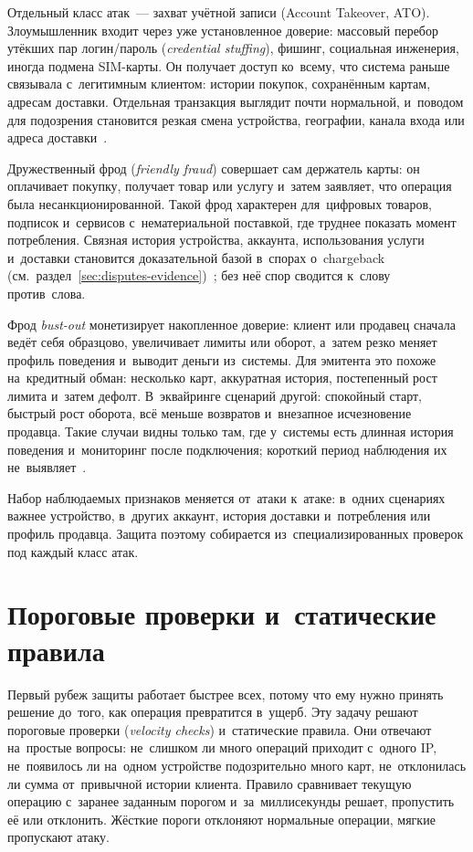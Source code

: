 Отдельный класс атак~--- захват учётной записи (Account Takeover, ATO).
Злоумышленник входит через уже установленное доверие: массовый перебор утёкших
пар логин/пароль (\textit{credential stuffing}), фишинг, социальная инженерия,
иногда подмена SIM-карты. Он получает доступ ко~всему, что система раньше
связывала с~легитимным клиентом: истории покупок, сохранённым картам, адресам
доставки. Отдельная транзакция выглядит почти нормальной, и~поводом для
подозрения становится резкая смена устройства, географии, канала входа или
адреса доставки~\cite{mc-fraudulent-merchants-2025}.

Дружественный фрод (\textit{friendly fraud}) совершает сам держатель карты: он
оплачивает покупку, получает товар или услугу и~затем заявляет, что операция
была несанкционированной. Такой фрод характерен для~цифровых товаров, подписок
и~сервисов с~нематериальной поставкой, где труднее показать момент потребления.
Связная история устройства, аккаунта, использования услуги и~доставки
становится доказательной базой в~спорах о~chargeback
(см.~раздел~\ref{sec:disputes-evidence})~\cite{mc-first-party-trust}; без неё
спор сводится к~слову против~слова.

Фрод \textit{bust-out} монетизирует накопленное доверие: клиент или продавец
сначала ведёт себя образцово, увеличивает лимиты или оборот,
а~затем резко меняет профиль поведения и~выводит деньги из~системы. Для
эмитента это похоже на~кредитный обман: несколько карт, аккуратная история,
постепенный рост лимита и~затем дефолт. В~эквайринге сценарий другой:
спокойный старт, быстрый рост оборота, всё меньше возвратов и~внезапное
исчезновение продавца. Такие случаи видны только там, где у~системы есть
длинная история поведения и~мониторинг после подключения; короткий период
наблюдения их не~выявляет~\cite{visa-merchant-screening-service,mc-fraudulent-merchants-2025}.

Набор наблюдаемых признаков меняется от~атаки к~атаке: в~одних сценариях важнее
устройство, в~других аккаунт, история доставки и~потребления или профиль
продавца. Защита поэтому собирается из~специализированных проверок под каждый
класс атак.

\section{Пороговые проверки и~статические правила}\label{sec:fraud-rules}

Первый рубеж защиты работает быстрее всех, потому что ему нужно принять решение
до~того, как операция превратится в~ущерб. Эту задачу решают пороговые проверки
(\textit{velocity checks}) и~статические правила. Они отвечают на~простые
вопросы: не~слишком ли много операций приходит с~одного IP, не~появилось ли
на~одном устройстве подозрительно много карт, не~отклонилась ли сумма
от~привычной истории клиента. Правило сравнивает текущую операцию
с~заранее заданным порогом и~за~миллисекунды решает, пропустить её или
отклонить. Жёсткие пороги отклоняют нормальные операции, мягкие пропускают
атаку.

